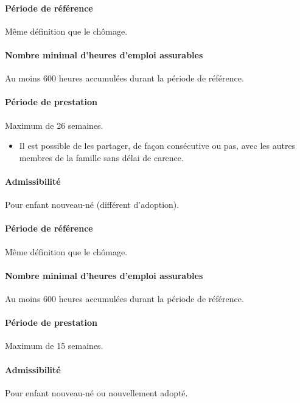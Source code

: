 \documentclass[10pt, french]{article}
\begin{document}
\begin{multicols*}{3}
\begin{definitionNOHFILL}
\paragraph{Période de référence}
Même définition que le chômage.

\paragraph{Nombre minimal d'heures d'emploi assurables}
Au moins 600 heures accumulées durant la période de référence.

\paragraph{Période de prestation}
Maximum de 26 semaines.
\begin{itemize}[leftmargin = *]
	\item	Il est possible de les partager, de façon consécutive ou pas, avec les autres membres de la famille sans délai de carence.
\end{itemize}
\end{definitionNOHFILL}

\begin{definitionNOHFILL}
\paragraph{Admissibilité}
Pour enfant nouveau-né (différent d'adoption).

\paragraph{Période de référence}
Même définition que le chômage.

\paragraph{Nombre minimal d'heures d'emploi assurables}
Au moins 600 heures accumulées durant la période de référence.

\paragraph{Période de prestation}
Maximum de 15 semaines.
\end{definitionNOHFILL}

\begin{definitionNOHFILL}
\paragraph{Admissibilité}
Pour enfant nouveau-né ou nouvellement adopté.


\end{definitionNOHFILL}
\end{multicols*}
\end{document}
